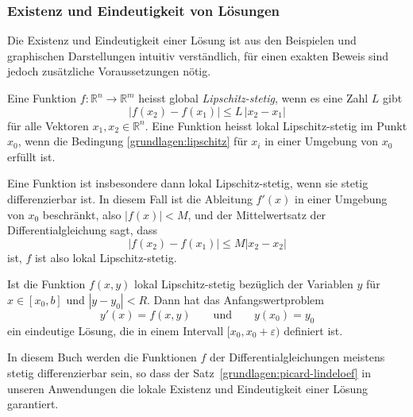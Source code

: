 \subsubsection{Existenz und Eindeutigkeit von Lösungen}
Die Existenz und Eindeutigkeit einer Lösung ist aus den Beispielen und
graphischen Darstellungen intuitiv verständlich, für einen exakten
Beweis sind jedoch zusätzliche Voraussetzungen nötig.

\begin{definition}
Eine Funktion $f\colon \mathbb R^n\to\mathbb R^m$ heisst global
{\em Lipschitz-stetig},
%
wenn es eine Zahl $L$ gibt 
\begin{equation}
|f(x_2)-f(x_1)| \le L\,|x_2-x_1|
\label{grundlagen:lipschitz}
\end{equation}
für alle Vektoren $x_1,x_2\in\mathbb R^n$.
Eine Funktion heisst lokal Lipschitz-stetig im Punkt $x_0$, wenn die
Bedingung \eqref{grundlagen:lipschitz} für $x_i$ in einer Umgebung von
$x_0$ erfüllt ist.
\end{definition}

Eine Funktion ist insbesondere dann lokal Lipschitz-stetig, wenn sie
stetig differenzierbar ist.
In diesem Fall ist die Ableitung $f'(x)$ in einer Umgebung von $x_0$
beschränkt, also $|f(x)|<M$, und der Mittelwertsatz der Differentialgleichung
sagt, dass
\[
|f(x_2)-f(x_1)|\le M |x_2-x_2|
\]
ist, $f$ ist also lokal Lipschitz-stetig.

\begin{satz}
\label{grundlagen:picard-lindeloef}
%
%
Ist die Funktion $f(x,y)$ lokal Lipschitz-stetig bezüglich der Variablen
$y$ für $x\in[x_0,b]$ und $|y-y_0|<R$.
Dann hat das Anfangswertproblem
\[
y'(x)=f(x,y)\qquad\text{und}\qquad y(x_0)=y_0
\]
ein eindeutige Lösung, die in einem Intervall $[x_0,x_0+\varepsilon)$
definiert ist.
\end{satz}
%
%

In diesem Buch werden die Funktionen $f$ der Differentialgleichungen 
meistens stetig differenzierbar sein, so dass der
Satz~\ref{grundlagen:picard-lindeloef} in unseren Anwendungen die lokale
Existenz und Eindeutigkeit einer Lösung garantiert.

